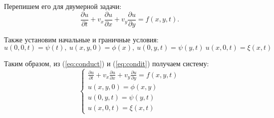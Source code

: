 Перепишем его для двумерной задачи:
\begin{equation}
	\frac{\partial u}{\partial t} + v_{x} \frac{\partial u}{\partial x} + v_{y}\frac{\partial u}{\partial y} = f(x,y,t).
	\label{eq:conduct}
\end{equation}

Также установим начальные и граничные условия:
\begin{equation}
	u(0,0,t) = \psi(t), \ u(x,y,0) = \phi(x), \ u(0,y,t) = \psi(y,t) \ u(x,0,t) = \xi(x,t)
	\label{eq:condit}
\end{equation}

Таким образом, из (\ref{eq:conduct}) и (\ref{eq:condit}) получаем систему:
\begin{equation}
	\begin{cases}
			\frac{\partial u}{\partial t} + v_{x} \frac{\partial u}{\partial x} +v_{y}\frac{\partial u}{\partial y}  = f(x,y,t) \\
			u(x,y,0) = \phi(x,y) \\
			u(0,y,t) = \psi(y,t) \\
			u(x,0,t) = \xi(x,t)
	\end{cases}
	\label{eq:sys}
\end{equation}